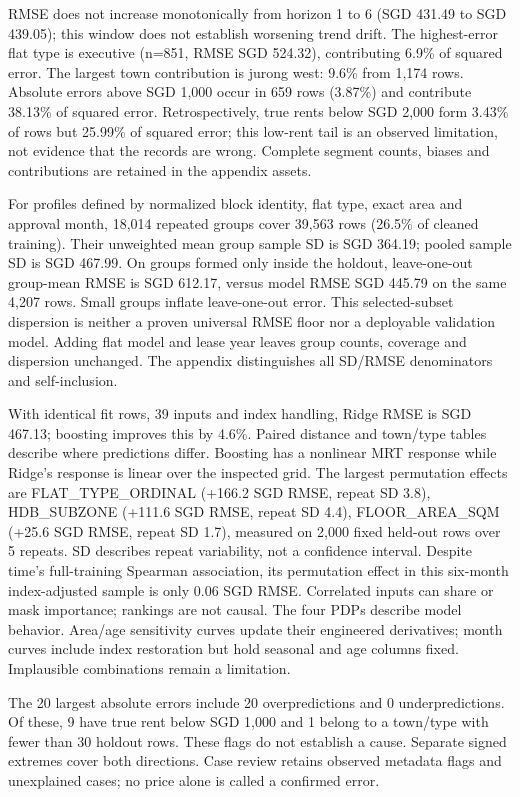 RMSE does not increase monotonically from horizon 1 to 6 (SGD 431.49 to SGD 439.05); this window does not establish worsening trend drift. The highest-error flat type is executive (n=851, RMSE SGD 524.32), contributing 6.9\% of squared error. The largest town contribution is jurong west: 9.6\% from 1,174 rows. Absolute errors above SGD 1,000 occur in 659 rows (3.87\%) and contribute 38.13\% of squared error. Retrospectively, true rents below SGD 2,000 form 3.43\% of rows but 25.99\% of squared error; this low-rent tail is an observed limitation, not evidence that the records are wrong. Complete segment counts, biases and contributions are retained in the appendix assets.

For profiles defined by normalized block identity, flat type, exact area and approval month, 18,014 repeated groups cover 39,563 rows (26.5\% of cleaned training). Their unweighted mean group sample SD is SGD 364.19; pooled sample SD is SGD 467.99. On groups formed only inside the holdout, leave-one-out group-mean RMSE is SGD 612.17, versus model RMSE SGD 445.79 on the same 4,207 rows. Small groups inflate leave-one-out error. This selected-subset dispersion is neither a proven universal RMSE floor nor a deployable validation model. Adding flat model and lease year leaves group counts, coverage and dispersion unchanged. The appendix distinguishes all SD/RMSE denominators and self-inclusion.

With identical fit rows, 39 inputs and index handling, Ridge RMSE is SGD 467.13; boosting improves this by 4.6\%. Paired distance and town/type tables describe where predictions differ. Boosting has a nonlinear MRT response while Ridge's response is linear over the inspected grid. The largest permutation effects are FLAT\_TYPE\_ORDINAL (+166.2 SGD RMSE, repeat SD 3.8), HDB\_SUBZONE (+111.6 SGD RMSE, repeat SD 4.4), FLOOR\_AREA\_SQM (+25.6 SGD RMSE, repeat SD 1.7), measured on 2,000 fixed held-out rows over 5 repeats. SD describes repeat variability, not a confidence interval. Despite time's full-training Spearman association, its permutation effect in this six-month index-adjusted sample is only 0.06 SGD RMSE. Correlated inputs can share or mask importance; rankings are not causal. The four PDPs describe model behavior. Area/age sensitivity curves update their engineered derivatives; month curves include index restoration but hold seasonal and age columns fixed. Implausible combinations remain a limitation.

The 20 largest absolute errors include 20 overpredictions and 0 underpredictions. Of these, 9 have true rent below SGD 1,000 and 1 belong to a town/type with fewer than 30 holdout rows. These flags do not establish a cause. Separate signed extremes cover both directions. Case review retains observed metadata flags and unexplained cases; no price alone is called a confirmed error.

